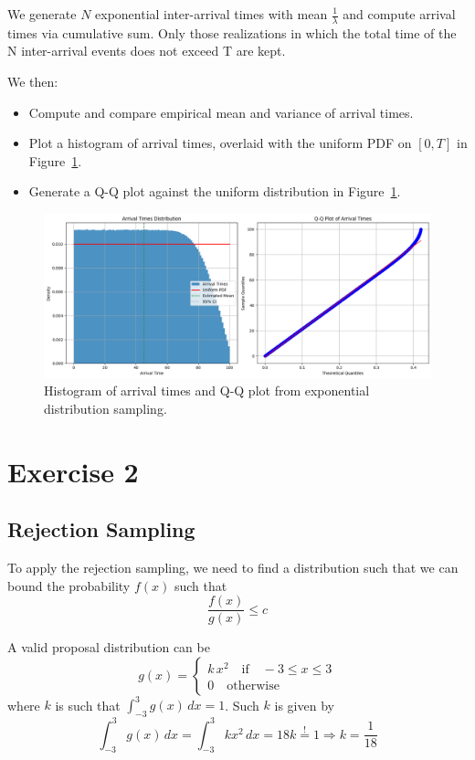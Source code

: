 \documentclass[a4paper,12pt]{article}
\begin{document}
We generate $N$ exponential inter-arrival times with mean $\frac{1}{\lambda}$ and compute arrival times via cumulative sum. Only those realizations in which the total time of the N inter-arrival events does not exceed T are kept.

We then:

\begin{itemize}
  \item Compute and compare empirical mean and variance of arrival times.
  \item Plot a histogram of arrival times, overlaid with the uniform PDF on $[0, T]$ in Figure~\ref{fig:ex1-p2}.
  \item Generate a Q-Q plot against the uniform distribution in Figure~\ref{fig:ex1-p2}.
\end{itemize}

\begin{figure}[htbp]
  \centering
  \includegraphics[width=\textwidth]{images/ex1-p2.png}
  \caption{Histogram of arrival times and Q-Q plot from exponential distribution sampling.}\label{fig:ex1-p2}
\end{figure}

\section*{Exercise 2}

\subsection*{Rejection Sampling}
To apply the rejection sampling, we need to find a distribution such that we can bound the probability $f(x)$ such that
\begin{equation*}
  \frac{f(x)}{g(x)} \leq c
\end{equation*}

A valid proposal distribution can be
\begin{equation*}
  g(x) =
  \begin{cases}
    k \, x^2 \quad \text{if} \quad -3\leq x\leq3 \\
    0 \quad \text{otherwise}
  \end{cases}
\end{equation*}
where $k$ is such that $\int_{-3}^{3} g(x) \, dx =1$.
Such $k$ is given by
\begin{equation*}
  \int_{-3}^{3} g(x) \, dx =\int_{-3}^{3} kx^2 \, dx =  18k \overset{!}{=} 1 \Rightarrow k = \frac{1}{18}
\end{equation*}
\end{document}
